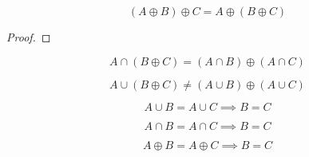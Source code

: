 \begin{frame}{}
  \[
    (A \oplus B) \oplus C = A \oplus (B \oplus C)
  \]

  \begin{proof}
    
  \end{proof}
\end{frame}

\begin{frame}{}
  \[
    A \cap (B \oplus C) = (A \cap B) \oplus (A \cap C)
  \]

  \pause
  \[
    A \cup (B \oplus C) \neq (A \cup B) \oplus (A \cup C)
  \]
\end{frame}

\begin{frame}{}
  \[
    A \cup B = A \cup C \implies B = C
  \]

  \[
    A \cap B = A \cap C \implies B = C
  \]


  \[
    A \oplus B = A \oplus C \implies B = C
  \]
\end{frame}

\begin{frame}{}
\end{frame}

\begin{frame}{}
\end{frame}
